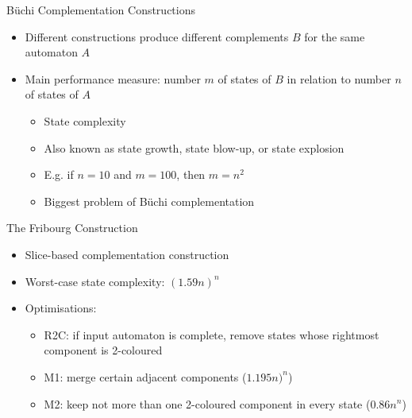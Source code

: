 \documentclass[12pt,handout]{beamer}
\begin{document}
\begin{frame}{Büchi Complementation Constructions}
\centering
{}
\begin{itemize}
\item Different constructions produce different complements $B$ for the same automaton $A$
\item Main performance measure: number $m$ of states of $B$ in relation to number $n$ of states of $A$
  \begin{itemize}
  \item State complexity
  \item Also known as state growth, state blow-up, or state explosion
  \item E.g. if $n=10$ and $m=100$, then $m=n^2$
  \item Biggest problem of Büchi complementation
  \end{itemize}
\end{itemize}
\end{frame}


\begin{frame}{The Fribourg Construction}
\begin{itemize}
\item Slice-based complementation construction
\item Worst-case state complexity: $(1.59n)^n$
\item Optimisations:
  \begin{itemize}
  \item R2C: if input automaton is complete, remove states whose rightmost component is 2-coloured
  \item M1: merge certain adjacent components ($1.195n)^n$)
  \item M2: keep not more than one 2-coloured component in every state ($0.86n^n$)
  \end{itemize}
\end{itemize}
\end{frame}
\end{document}
